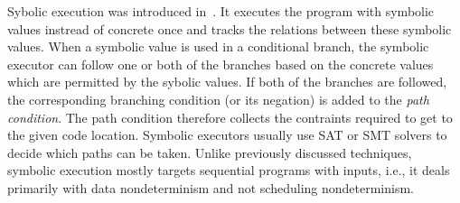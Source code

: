 Sybolic execution was introduced in~.
It executes the program with symbolic values instread of concrete once and tracks the relations between these symbolic values.
When a symbolic value is used in a conditional branch, the symbolic executor can follow one or both of the branches based on the concrete values which are permitted by the sybolic values.
If both of the branches are followed, the corresponding branching condition (or its negation) is added to the \emph{path condition}.
The path condition therefore collects the contraints required to get to the given code location.
Symbolic executors usually use SAT or SMT solvers to decide which paths can be taken.
Unlike previously discussed techniques, symbolic execution mostly targets sequential programs with inputs, i.e., it deals primarily with data nondeterminism and not scheduling nondeterminism.

